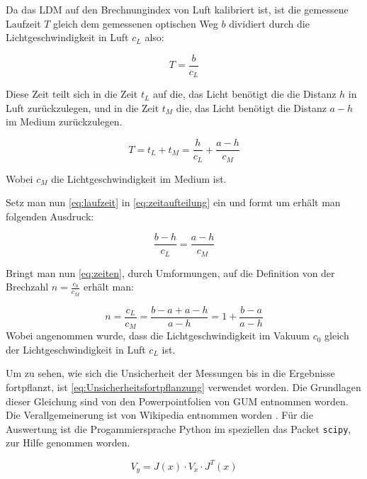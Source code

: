 \documentclass[11pt,ngerman]{scrartcl}
\begin{document}
Da das LDM auf den Brechnungindex von Luft kalibriert ist, ist die gemessene
Laufzeit $T$ gleich dem gemessenen optischen Weg $b$ dividiert durch
die Lichtgeschwindigkeit in Luft $c_L$ also:

\begin{equation}
    T =  \frac{b}{c_L} \label{eq:laufzeit}
\end{equation}

Diese Zeit teilt sich in die Zeit $t_L$ auf die, das Licht benötigt die 
die Distanz $h$ in Luft zurückzulegen, und in die Zeit $t_M$ die, das 
Licht benötigt die Distanz $a-h$ im Medium zurückzulegen.

\begin{equation}
    T = t_L + t_M  = \frac{h}{c_L} + \frac{a-h}{c_M}  \label{eq:zeitaufteilung}
\end{equation}

Wobei $c_M$ die Lichtgeschwindigkeit im Medium ist.

Setz man nun \autoref{eq:laufzeit} in \autoref{eq:zeitaufteilung}
ein und formt um erhält man folgenden Ausdruck:

\begin{equation}
    \frac{b-h}{c_L} = \frac{a-h}{c_M} \label{eq:zeiten}
\end{equation}

Bringt man nun \autoref{eq:zeiten}, durch Umformungen, auf die Definition von
der Brechzahl $n=\frac{c_0}{c_M}$ erhält man:

\begin{equation}
    n = \frac{c_L}{c_M} = \frac{b-a+a-h}{a-h} = 1 + \frac{b-a}{a-h} \label{eq:brechzahl}
\end{equation}
Wobei angenommen wurde, dass die Lichtgeschwindigkeit im Vakuum $c_0$
gleich der Lichtgeschwindigkeit in Luft $c_L$ ist.


Um zu sehen, wie sich die Unsicherheit der Messungen bis in die Ergebnisse 
fortpflanzt, ist \autoref{eq:Unsicherheitsfortpflanzung} verwendet worden.
Die Grundlagen dieser Gleichung sind von den Powerpointfolien von 
GUM entnommen worden.\cite{WolfgangKessel2004} Die Verallgemeinerung ist von Wikipedia entnommen
worden \cite{2020Fehler}.
Für die Auswertung ist die Progammiersprache Python im speziellen das 
Packet \verb#scipy#, zur Hilfe genommen worden.

\begin{equation}
    \label{eq:Unsicherheitsfortpflanzung}
    V_y = J(x) \cdot V_x \cdot J^{T}(x)
\end{equation}
\end{document}

